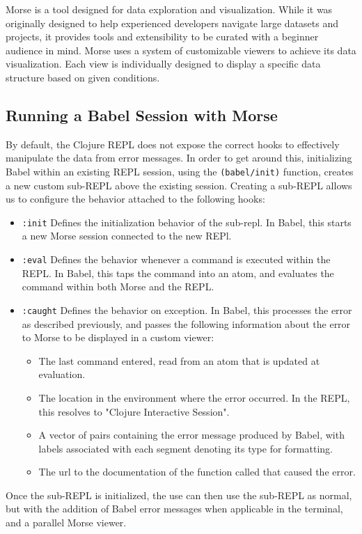 \documentclass[12pt]{article}
\begin{document}
Morse is a tool designed for data exploration and visualization.
While it was originally designed to help experienced developers navigate large datasets and projects, 
it provides tools and extensibility to be curated with a beginner audience in mind.
Morse uses a system of customizable viewers to achieve its data visualization.
Each view is individually designed to display a specific data structure based on given conditions.

\subsection{Running a Babel Session with Morse}\label{subsec:babel-w-morse}

By default, the Clojure REPL does not expose the correct hooks to effectively manipulate the data from error messages.
In order to get around this, initializing Babel within an existing REPL session, using the \texttt{(babel/init)} function, creates a new custom sub-REPL above the existing session.
Creating a sub-REPL allows us to configure the behavior attached to the following hooks:
\begin{itemize}
	\item \texttt{:init} Defines the initialization behavior of the sub-repl. 
		In Babel, this starts a new Morse session connected to the new REPl.
	\item \texttt{:eval} Defines the behavior whenever a command is executed within the REPL. 
		In Babel, this taps the command into an atom, and evaluates the command within both Morse and the REPL.
	\item \texttt{:caught} Defines the behavior on exception.
		In Babel, this processes the error as described previously, 
			and passes the following information about the error to Morse to be displayed in a custom viewer:
			\begin{itemize}
				\item The last command entered, read from an atom that is updated at evaluation.
				\item The location in the environment where the error occurred. In the REPL, this resolves to "Clojure Interactive Session".
				\item A vector of pairs containing the error message produced by Babel, with labels associated with each segment denoting its type for formatting.
				\item The url to the documentation of the function called that caused the error. 
			\end{itemize}
\end{itemize}
Once the sub-REPL is initialized, the use can then use the sub-REPL as normal, but with the addition of Babel error messages when applicable in the terminal, and a parallel Morse viewer.
\end{document}
